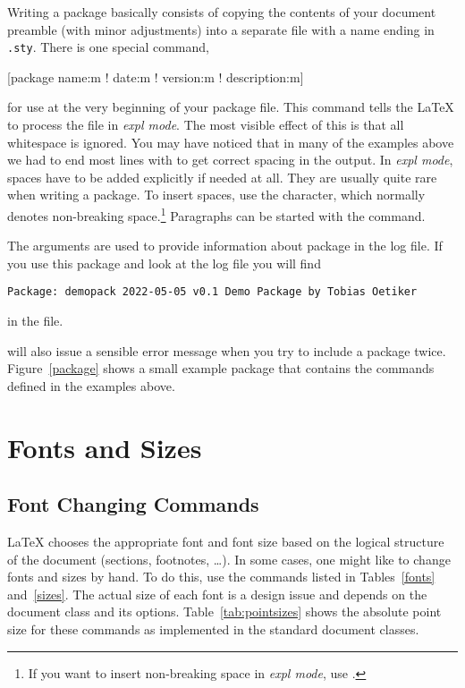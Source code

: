 Writing a package basically consists of copying the contents of your document
preamble (with minor adjustments) into a separate file with a name ending in
\texttt{.sty}. There is one special command,
\begin{lscommand}
[package name:m ! date:m ! version:m ! description:m]
\end{lscommand}
\noindent for use at the very beginning of your package file. This command
tells the \LaTeX{} to process the  file in \emph{expl mode}. The most visible effect of this is
that all whitespace is ignored. You may have noticed that in many of the
examples above we had to end most lines with \ai{\%} to get correct
spacing in the output. In \emph{expl mode}, spaces have to be added explicitly if needed at all. They are usually
quite rare when writing a package. To insert spaces, use
the \ai{\~} character, which normally denotes non-breaking space.\footnote{If
  you want to insert non-breaking space in \emph{expl mode}, use
  .} Paragraphs can be started with the  command.

The arguments are used to provide information about package in the log file. If
you use this package and look at the log file you will find
\begin{verbatim}
Package: demopack 2022-05-05 v0.1 Demo Package by Tobias Oetiker
\end{verbatim}
in the  file.

 will also issue a sensible error message when you try
to include a package twice. Figure~\ref{package} shows a small example package
that contains the commands defined in the examples above.

\section{Fonts and Sizes}
\label{sec:fontsize}

\subsection{Font Changing Commands}
 \LaTeX{} chooses the appropriate font
and font size based on the logical structure of the document
(sections, footnotes, \ldots).  In some cases, one might like to change
fonts and sizes by hand. To do this, use the commands listed in
Tables~\ref{fonts} and~\ref{sizes}. The actual size of each font
is a design issue and depends on the document class and its options.
Table~\ref{tab:pointsizes} shows the absolute point size for these
commands as implemented in the standard document classes.

